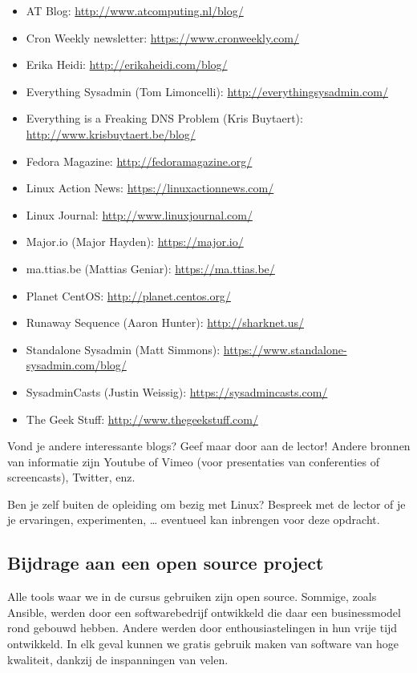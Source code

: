 \begin{itemize}
\item AT Blog: \url{http://www.atcomputing.nl/blog/}
\item Cron Weekly newsletter: \url{https://www.cronweekly.com/}
\item Erika Heidi: \url{http://erikaheidi.com/blog/}
\item Everything Sysadmin (Tom Limoncelli): \url{http://everythingsysadmin.com/}
\item Everything is a Freaking DNS Problem (Kris Buytaert): \url{http://www.krisbuytaert.be/blog/}
\item Fedora Magazine: \url{http://fedoramagazine.org/}
\item Linux Action News: \url{https://linuxactionnews.com/}
\item Linux Journal: \url{http://www.linuxjournal.com/}
\item Major.io (Major Hayden): \url{https://major.io/}
\item ma.ttias.be (Mattias Geniar): \url{https://ma.ttias.be/}
\item Planet CentOS: \url{http://planet.centos.org/}
\item Runaway Sequence (Aaron Hunter): \url{http://sharknet.us/}
\item Standalone Sysadmin (Matt Simmons): \url{https://www.standalone-sysadmin.com/blog/}
\item SysadminCasts (Justin Weissig): \url{https://sysadmincasts.com/}
\item The Geek Stuff: \url{http://www.thegeekstuff.com/}
\end{itemize}

Vond je andere interessante blogs? Geef maar door aan de lector! Andere bronnen van informatie zijn Youtube of Vimeo (voor presentaties van conferenties of screencasts), Twitter, enz.

Ben je zelf buiten de opleiding om bezig met Linux? Bespreek met de lector of je je ervaringen, experimenten, \ldots{} eventueel kan inbrengen voor deze opdracht.

\subsection{Bijdrage aan een open source project}
\label{subs:bijdrage-aan-een-open-source-project}

Alle tools waar we in de cursus gebruiken zijn open source. Sommige, zoals Ansible, werden door een softwarebedrijf ontwikkeld die daar een businessmodel rond gebouwd hebben. Andere werden door enthousiastelingen in hun vrije tijd ontwikkeld. In elk geval kunnen we gratis gebruik maken van software van hoge kwaliteit, dankzij de inspanningen van velen.

